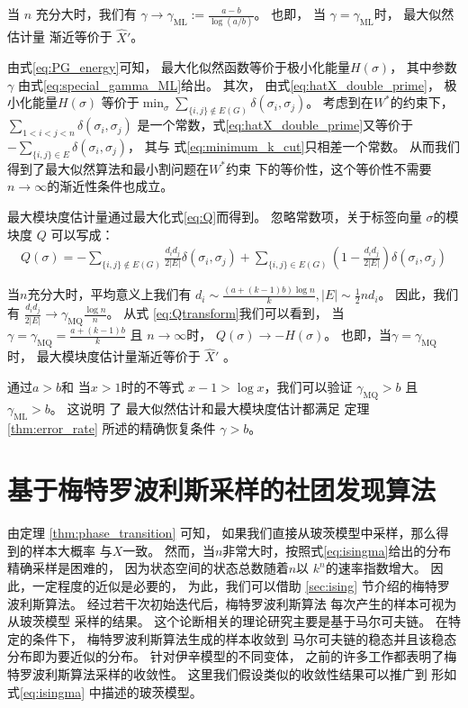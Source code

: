 当 $n$ 充分大时，我们有 $\gamma \to \gamma_{\mathrm{ML}} := \frac{a-b}{\log(a/b)}$。   
也即，
当 $\gamma = \gamma_{\mathrm{ML}}$时，
最大似然估计量 渐近等价于 $\hat{X}'$。

由式\eqref{eq:PG_energy}可知，
最大化似然函数等价于极小化能量$H(\sigma)$，
其中参数$\gamma$
由式\eqref{eq:special_gamma_ML}给出。
其次，
由式\eqref{eq:hatX_double_prime}，
极小化能量$H(\sigma)$
等价于$\min_{\sigma} \sum_{\{i,j\} \not\in E(G) } \delta(\sigma_i, \sigma_j)$。
考虑到在$W^*$的约束下，
$\sum_{1<i<j<n} \delta(\sigma_i, \sigma_j)$
是一个常数，式\eqref{eq:hatX_double_prime}又等价于
$-\sum_{ \{i,j\} \in E} \delta(\sigma_i, \sigma_j)$，
其与 式\eqref{eq:minimum_k_cut}只相差一个常数。
从而我们得到了最大似然算法和最小割问题在$W^*$约束
下的等价性，这个等价性不需要$n\to\infty$的渐近性条件也成立。


最大模块度估计量通过最大化式\eqref{eq:Q}而得到。
忽略常数项，关于标签向量 $\sigma$的模块度 $Q$
可以写成：
\begin{align}
Q(\sigma) = -\sum_{\{i,j\} \not\in E(G) } \frac{d_i d_j}{2 |E|}\delta(\sigma_i,\sigma_j) 
+ \sum_{\{i,j\} \in E(G) } \left(1 - \frac{d_i d_j}{2 |E|} \right) \delta(\sigma_i,\sigma_j)  \label{eq:Qtransform}
\end{align}

当$n$充分大时，平均意义上我们有 $d_i \sim  \frac{(a+(k-1)b)\log n}{k}, |E| \sim \frac{1}{2}n d_i$。
因此，我们有
$\frac{d_id_j}{2|E|} \to \gamma_{\mathrm{MQ}} \frac{\log n}{n} $。
从式 \eqref{eq:Qtransform}我们可以看到，
当 $\gamma = \gamma_{\mathrm{MQ}} = \frac{a+(k-1)b}{k}$ 且 $n\to \infty$时，
$Q(\sigma) \to -H(\sigma)$。
也即，当$\gamma = \gamma_{\mathrm{MQ}}$ 时，
最大模块度估计量渐近等价于
$\hat{X}'$ 。


通过$a>b$和 当$x>1$时的不等式 
 $x-1>\log x $，我们可以验证
  $\gamma_{\mathrm{MQ}} >b$ 且  $\gamma_{\mathrm{ML}} > b$。
  这说明 了
  最大似然估计和最大模块度估计都满足
  定理 \ref{thm:error_rate} 所述的精确恢复条件 $\gamma > b $。

\section{基于梅特罗波利斯采样的社团发现算法}\label{sec:ms}

由定理 \ref{thm:phase_transition} 可知，
如果我们直接从玻茨模型中采样，那么得到的样本大概率
与$X$一致。
然而，当$n$非常大时，按照式\eqref{eq:isingma}给出的分布精确采样是困难的，
因为状态空间的状态总数随着$n$以
$k^n$的速率指数增大。
因此，一定程度的近似是必要的，
为此，我们可以借助 \ref{sec:ising} 节介绍的梅特罗波利斯算法。 
经过若干次初始迭代后，梅特罗波利斯算法
每次产生的样本可视为从玻茨模型 采样的结果。
这个论断相关的理论研究主要是基于马尔可夫链。
在特定的条件下，
梅特罗波利斯算法生成的样本收敛到
马尔可夫链的稳态并且该稳态分布即为要近似的分布。
针对伊辛模型的不同变体，
之前的许多工作都表明了梅特罗波利斯算法采样的收敛性\cite{diaconis1998we}。
这里我们假设类似的收敛性结果可以推广到
形如 式\eqref{eq:isingma} 中描述的玻茨模型。

